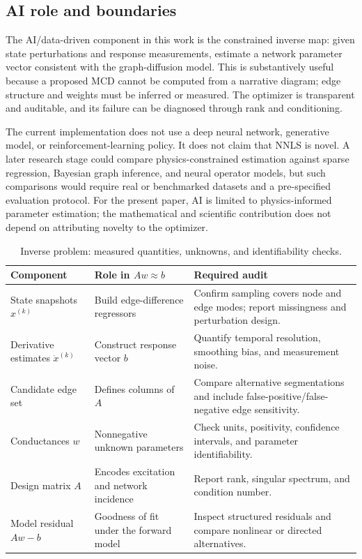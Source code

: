 \documentclass[12pt,a4paper]{article}
\begin{document}
\subsection{AI role and boundaries}
The AI/data-driven component in this work is the constrained inverse map: given state perturbations and response measurements, estimate a network parameter vector consistent with the graph-diffusion model. This is substantively useful because a proposed MCD cannot be computed from a narrative diagram; edge structure and weights must be inferred or measured. The optimizer is transparent and auditable, and its failure can be diagnosed through rank and conditioning.

The current implementation does not use a deep neural network, generative model, or reinforcement-learning policy. It does not claim that NNLS is novel. A later research stage could compare physics-constrained estimation against sparse regression, Bayesian graph inference, and neural operator models, but such comparisons would require real or benchmarked datasets and a pre-specified evaluation protocol. For the present paper, AI is limited to physics-informed parameter estimation; the mathematical and scientific contribution does not depend on attributing novelty to the optimizer.

\begin{table}[H]
\centering\small
\caption{Inverse problem: measured quantities, unknowns, and identifiability checks.}
\begin{tabularx}{\textwidth}{p{}p{}X}
\toprule
Component & Role in \(Aw\approx b\) & Required audit\\
\midrule
State snapshots \(x^{(k)}\) & Build edge-difference regressors & Confirm sampling covers node and edge modes; report missingness and perturbation design.\\
Derivative estimates \(\dot x^{(k)}\) & Construct response vector \(b\) & Quantify temporal resolution, smoothing bias, and measurement noise.\\
Candidate edge set & Defines columns of \(A\) & Compare alternative segmentations and include false-positive/false-negative edge sensitivity.\\
Conductances \(w\) & Nonnegative unknown parameters & Check units, positivity, confidence intervals, and parameter identifiability.\\
Design matrix \(A\) & Encodes excitation and network incidence & Report rank, singular spectrum, and condition number.\\
Model residual \(Aw-b\) & Goodness of fit under the forward model & Inspect structured residuals and compare nonlinear or directed alternatives.\\
\bottomrule
\end{tabularx}
\end{table}
\end{document}
